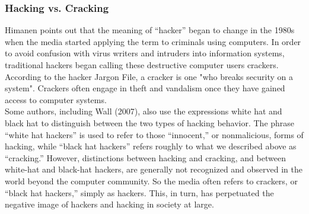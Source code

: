\documentclass[12pt]{article}
\theoremstyle{definition}
\begin{document}
\subsubsection{Hacking vs. Cracking}
Himanen points out that the meaning of “hacker” began to change in the 1980s when the
media started applying the term to criminals using computers. In order to avoid confusion
with virus writers and intruders into information systems, traditional hackers began
calling these destructive computer users crackers. According to the hacker Jargon File, a
cracker is one "who breaks security on a system". Crackers often engage in theft and
vandalism once they have gained access to computer systems.\\
Some authors, including Wall (2007), also use the expressions white hat and black
hat to distinguish between the two types of hacking behavior. The phrase “white hat
hackers” is used to refer to those “innocent,” or nonmalicious, forms of hacking, while
“black hat hackers” refers roughly to what we described above as “cracking.”
However, distinctions between hacking and cracking, and between white-hat and
black-hat hackers, are generally not recognized and observed in the world beyond
the computer community. So the media often refers to crackers, or “black hat hackers,”
simply as hackers. This, in turn, has perpetuated the negative image of hackers and
hacking in society at large.
\end{document}

